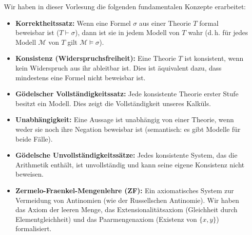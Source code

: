 \begin{nice-box}
Wir haben in dieser Vorlesung die folgenden fundamentalen Konzepte erarbeitet:
\begin{itemize}
    \item \textbf{Korrektheitssatz:} Wenn eine Formel $\sigma$ aus einer Theorie $T$ formal beweisbar ist ($T \vdash \sigma$), dann ist sie in jedem Modell von $T$ wahr (d.\,h. für jedes Modell $\mathcal{M}$ von $T$ gilt $\mathcal{M} \models \sigma$).
    \item \textbf{Konsistenz (Widerspruchsfreiheit):} Eine Theorie $T$ ist konsistent, wenn kein Widerspruch aus ihr ableitbar ist. Dies ist äquivalent dazu, dass mindestens eine Formel nicht beweisbar ist.
    \item \textbf{Gödelscher Vollständigkeitssatz:} Jede konsistente Theorie erster Stufe besitzt ein Modell. Dies zeigt die Vollständigkeit unseres Kalküls.
    \item \textbf{Unabhängigkeit:} Eine Aussage ist unabhängig von einer Theorie, wenn weder sie noch ihre Negation beweisbar ist (semantisch: es gibt Modelle für beide Fälle).
    \item \textbf{Gödelsche Unvollständigkeitssätze:} Jedes konsistente System, das die Arithmetik enthält, ist unvollständig und kann seine eigene Konsistenz nicht beweisen.
    \item \textbf{Zermelo-Fraenkel-Mengenlehre (ZF):} Ein axiomatisches System zur Vermeidung von Antinomien (wie der Russellschen Antinomie). Wir haben das Axiom der leeren Menge, das Extensionalitätsaxiom (Gleichheit durch Elementgleichheit) und das Paarmengenaxiom (Existenz von $\{x,y\}$) formalisiert.
\end{itemize}
\end{nice-box}

